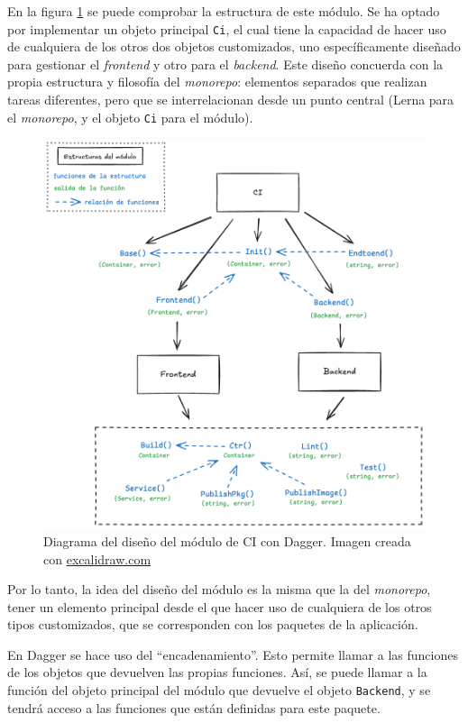 En la figura \ref{fig:dagger-ci} se puede comprobar la estructura de este módulo. Se ha optado por implementar un objeto principal \texttt{Ci}, el cual tiene la capacidad de hacer uso de cualquiera de los otros dos objetos customizados, uno específicamente diseñado para gestionar el \textit{frontend} y otro para el \textit{backend}. Este diseño concuerda con la propia estructura y filosofía del \textit{monorepo}: elementos separados que realizan tareas diferentes, pero que se interrelacionan desde un punto central (Lerna para el \textit{monorepo}, y el objeto \texttt{Ci} para el módulo).

\begin{figure}[h]
  \centerline{\includegraphics[width=12cm]{figuras/dagger-CI}}
  \caption{Diagrama del diseño del módulo de CI con Dagger. Imagen creada con \href{https://excalidraw.com}{excalidraw.com}}
  \label{fig:dagger-ci}
\end{figure}

Por lo tanto, la idea del diseño del módulo es la misma que la del \textit{monorepo}, tener un elemento principal desde el que hacer uso de cualquiera de los otros tipos customizados\cite{dagger-custom-types}, que se corresponden con los paquetes de la aplicación.

En Dagger se hace uso del ``encadenamiento''. Esto permite llamar a las funciones de los objetos que devuelven las propias funciones. Así, se puede llamar a la función del objeto principal del módulo que devuelve el objeto \texttt{Backend}, y se tendrá acceso a las funciones que están definidas para este paquete.

